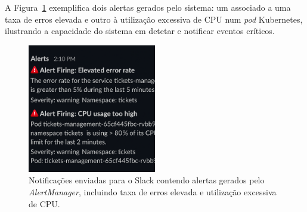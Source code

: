 A Figura~\ref{fig:slack-alerts} exemplifica dois alertas gerados pelo sistema: um associado a uma taxa de erros elevada e outro à utilização excessiva de CPU num \textit{pod} Kubernetes, ilustrando a capacidade do sistema em detetar e notificar eventos críticos.

\begin{figure}[H]
    \centering
    \includegraphics[width=0.5\textwidth]{images/Grafana/alertas.png}
    \caption{Notificações enviadas para o Slack contendo alertas gerados pelo \textit{AlertManager}, incluindo taxa de erros elevada e utilização excessiva de CPU.}
    \label{fig:slack-alerts}
\end{figure}


